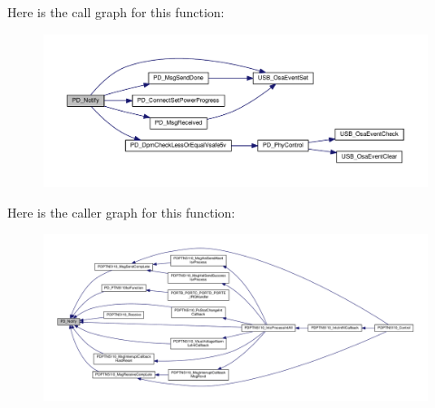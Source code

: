 Here is the call graph for this function\-:
\nopagebreak
\begin{figure}[H]
\begin{center}
\leavevmode
\includegraphics[width=350pt]{group__usb__pd__phy__drv_ga7f7f94758771b173653d27c508c8b33f_cgraph}
\end{center}
\end{figure}




Here is the caller graph for this function\-:
\nopagebreak
\begin{figure}[H]
\begin{center}
\leavevmode
\includegraphics[width=350pt]{group__usb__pd__phy__drv_ga7f7f94758771b173653d27c508c8b33f_icgraph}
\end{center}
\end{figure}


